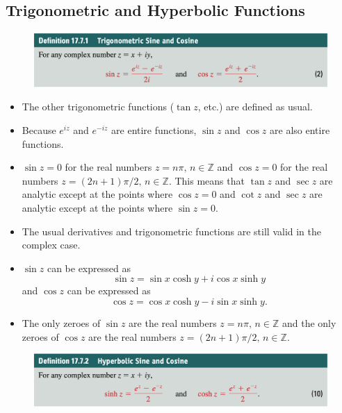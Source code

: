 \documentclass{article}
\begin{document}
\subsection{Trigonometric and Hyperbolic Functions}

\begin{figure}[H]
  \centering
  \includegraphics[width=\textwidth]{sine-and-cosine}
\end{figure}

\begin{itemize}
  \item The other trigonometric functions ($\tan z$, etc.) are defined as usual.

  \item Because $e^{i z}$ and $e^{-i z}$ are entire functions, $\sin z$ and $\cos z$ are also entire functions.

  \item $\sin z = 0$ for the real numbers $z = n \pi, \,n \in \mathbb{Z}$ and $\cos z = 0$ for the real numbers $z = (2 n + 1) \pi / 2, \,n \in \mathbb{Z}$. This means that $\tan z$ and $\sec z$ are analytic except at the points where $\cos z = 0$ and $\cot z$ and $\sec z$ are analytic except at the points where $\sin z = 0$.

  \item The usual derivatives and trigonometric functions are still valid in the complex case.

  \item $\sin z$ can be expressed as \[\sin z = \sin x \cosh y + i \cos x \sinh y\] and $\cos z$ can be expressed as \[\cos z = \cos x \cosh y - i \sin x \sinh y.\]

  \item The only zeroes of $\sin z$ are the real numbers $z = n \pi, \,n \in \mathbb{Z}$ and the only zeroes of $\cos z$ are the real numbers $z = (2 n + 1) \pi / 2, \,n \in \mathbb{Z}$.
\end{itemize}

\begin{figure}[H]
  \centering
  \includegraphics[width=\textwidth]{hyperbolic-sine-and-cosine}
\end{figure}
\end{document}
